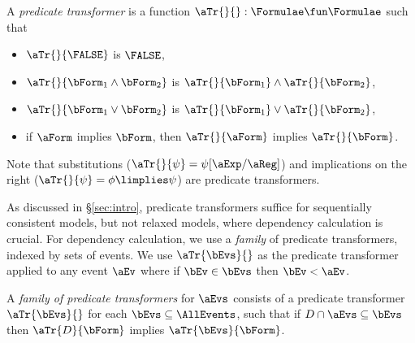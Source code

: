 \begin{definition}
  \label{def:trans}
  A \emph{predicate transformer} is a %
  function
  $\aTr{}{}:\Formulae\fun\Formulae$ such that
  \begin{itemize}
  \item $\aTr{}{\FALSE}$ is $\FALSE$,    
  \item $\aTr{}{\bForm_1\land\bForm_2}$ is $\aTr{}{\bForm_1}\land\aTr{}{\bForm_2}$,    
  \item $\aTr{}{\bForm_1\lor\bForm_2}$ is $\aTr{}{\bForm_1}\lor\aTr{}{\bForm_2}$, 
  \item if $\aForm$ implies $\bForm$, then $\aTr{}{\aForm}$ implies $\aTr{}{\bForm}$.
  \end{itemize}
\end{definition}
\noindent
Note that substitutions ($\aTr{}{\psi}=\psi[\aExp/\aReg]$) and implications on the right
($\aTr{}{\psi}=\phi\limplies\psi$) are predicate transformers.

As discussed in \S\ref{sec:intro}, predicate transformers suffice for sequentially consistent
models, but not relaxed models, where dependency calculation is crucial.
For dependency calculation, we use a \emph{family} of predicate transformers,
indexed by sets of events. We use $\aTr{\bEvs}{}$ as the predicate transformer
applied to any event $\aEv$ where if $\bEv\in\bEvs$ then $\bEv<\aEv$.

\begin{definition}
  \label{def:family}
  A \emph{family of predicate transformers} for $\aEvs$ consists of a
  predicate transformer $\aTr{\bEvs}{}$ for each $\bEvs\subseteq\AllEvents$,
  such that if $\cEvs \cap \aEvs \subseteq \bEvs$ then $\aTr{\cEvs}{\bForm}$
  implies $\aTr{\bEvs}{\bForm}$.
\end{definition}


